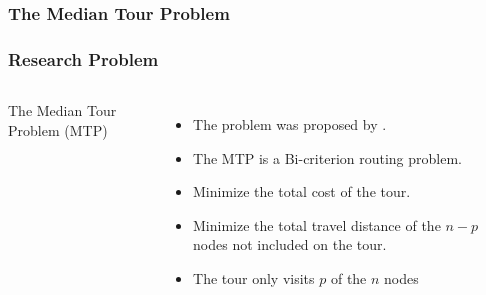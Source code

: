 \documentclass[aspectratio=169]{beamer}
\begin{document}
\subsubsection{The Median Tour Problem}
\begin{frame}
\frametitle{Research Problem}
\begin{columns}
The Median Tour Problem (MTP)
\begin{itemize}
\item The problem was proposed by \cite{Current:1994}.
\item The MTP is a Bi-criterion routing problem.
\item Minimize the total cost of the tour.
\item Minimize the total travel distance of the $n - p$ nodes not included on the tour.
\item The tour only visits $p$ of the $n$ nodes
\end{itemize}


\end{columns}
\end{frame}
\end{document}
